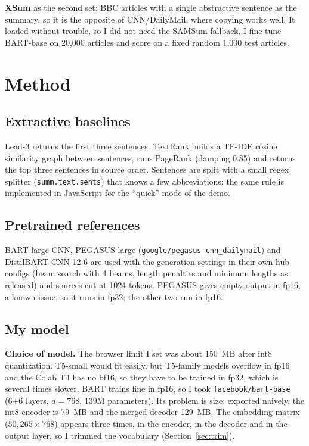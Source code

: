 \documentclass[11pt,a4paper]{article}
\begin{document}
\textbf{XSum} \cite{narayan18} as the second set: BBC articles with a single abstractive sentence as the
summary, so it is the opposite of CNN/DailyMail, where copying works well. It loaded without trouble, so I
did not need the SAMSum fallback. I fine-tune BART-base on 20,000 articles and score on a fixed random 1,000
test articles.

\section{Method}

\subsection{Extractive baselines}

Lead-3 returns the first three sentences. TextRank builds a TF-IDF cosine similarity graph between sentences,
runs PageRank (damping 0.85) and returns the top three sentences in source order. Sentences are split with
a small regex splitter (\texttt{summ.text.sents}) that knows a few abbreviations; the same rule is
implemented in JavaScript for the ``quick'' mode of the demo.

\subsection{Pretrained references}

BART-large-CNN, PEGASUS-large (\texttt{google/pegasus-cnn\_dailymail}) and DistilBART-CNN-12-6 are used with
the generation settings in their own hub configs (beam search with 4 beams, length penalties and minimum
lengths as released) and sources cut at 1024 tokens. PEGASUS gives empty output in fp16, a known issue, so it
runs in fp32; the other two run in fp16.

\subsection{My model}

\textbf{Choice of model.} The browser limit I set was about 150~MB after int8 quantization. T5-small would
fit easily, but T5-family models overflow in fp16 and the Colab T4 has no bf16, so they have to be trained in
fp32, which is several times slower. BART trains fine in fp16, so I took \texttt{facebook/bart-base}
(6+6 layers, $d=768$, 139M parameters). Its problem is size: exported naively, the int8 encoder is 79~MB and the
merged decoder 129~MB. The embedding matrix ($50{,}265\times768$) appears three times, in the encoder, in the
decoder and in the output layer, so I trimmed the vocabulary (Section~\ref{sec:trim}).
\end{document}
